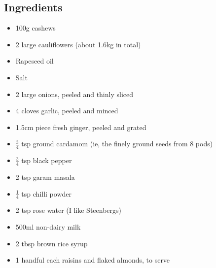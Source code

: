\documentclass{book}
\begin{document}
\subsection*{Ingredients}
\begin{itemize}
\item 100g cashews
\item 2 large cauliflowers (about 1.6kg in total)
\item Rapeseed oil
\item Salt
\item 2 large onions, peeled and thinly sliced
\item 4 cloves garlic, peeled and minced
\item 1.5cm piece fresh ginger, peeled and grated
\item $\frac{3}{4}$ tsp ground cardamom (ie, the finely ground seeds from 8 pods)
\item $\frac{3}{4}$ tsp black pepper
\item 2 tsp garam masala
\item $\frac{1}{4}$ tsp chilli powder
\item 2 tsp rose water (I like Steenbergs)
\item 500ml non-dairy milk
\item 2 tbsp brown rice syrup
\item 1 handful each raisins and flaked almonds, to serve
\end{itemize}
\end{document}
